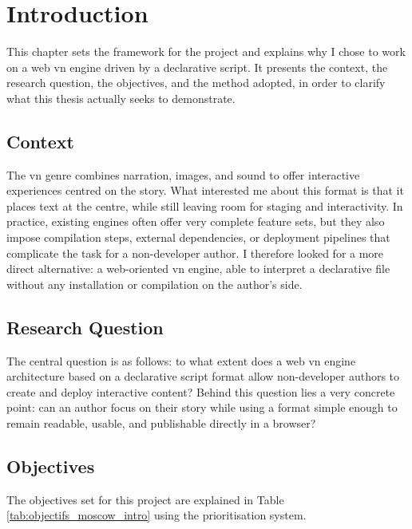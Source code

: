 \section{Introduction}

This chapter sets the framework for the project and explains why I chose to work on a web \gls{vn} engine driven by a declarative script. It presents the context, the research question, the objectives, and the method adopted, in order to clarify what this thesis actually seeks to demonstrate.

\subsection{Context}
The \gls{vn} genre combines narration, images, and sound to offer interactive experiences centred on the story. What interested me about this format is that it places text at the centre, while still leaving room for staging and interactivity. In practice, existing engines often offer very complete feature sets, but they also impose compilation steps, external dependencies, or deployment pipelines that complicate the task for a non-developer author. I therefore looked for a more direct alternative: a web-oriented \gls{vn} engine, able to interpret a declarative file without any installation or compilation on the author's side.

\subsection{Research Question}
The central question is as follows: to what extent does a web \acrlong{vn} engine architecture based on a declarative script format allow non-developer authors to create and deploy interactive content? Behind this question lies a very concrete point: can an author focus on their story while using a format simple enough to remain readable, usable, and publishable directly in a browser?

\clearpage

\subsection{Objectives}
The objectives set for this project are explained in Table \ref{tab:objectifs_moscow_intro} using the  prioritisation system.

